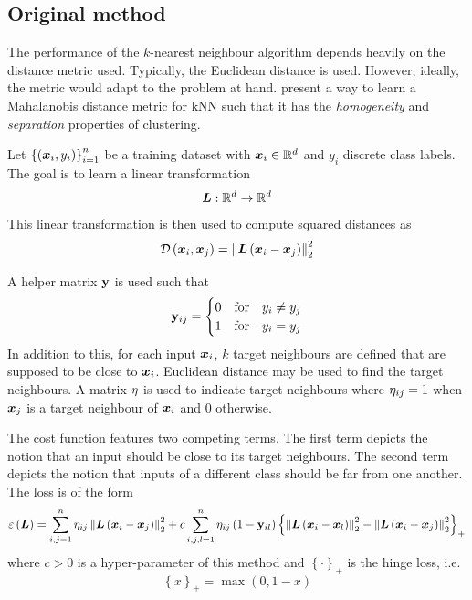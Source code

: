 \subsection{Original method}
The performance of the \( k \)-nearest neighbour algorithm depends heavily on the distance metric used. Typically, the Euclidean distance is used. However, ideally, the metric would adapt to the problem at hand. \cite{weinberger_distance_2006} present a way to learn a Mahalanobis distance metric for kNN such that it has the \textit{homogeneity} and \textit{separation} properties of clustering.

Let \( \left\{ \left( \bm{x}_i, y_i \right) \right\}_{i = 1}^n \) be a training dataset with \( \bm{x}_i \in \mathbb{R}^d \) and \( y_i \) discrete class labels. The goal is to learn a linear transformation
\[ \bm{L} : \mathbb{R}^d \to \mathbb{R}^d \]
This linear transformation is then used to compute squared distances as
\[ \mathcal{D} \left( \bm{x}_i, \bm{x}_j \right) = \left\lVert \bm{L} \left( \bm{x}_i - \bm{x}_j \right) \right\rVert_2^2 \]

A helper matrix \( \mathbf{y} \) is used such that
\[ \mathbf{y}_{ij} = \begin{cases}
    0 &\text{for} \quad y_i \neq y_j \\
    1 &\text{for} \quad y_i = y_j \\
  \end{cases} \]
In addition to this, for each input \( \bm{x}_i \), \( k \) target neighbours are defined that are supposed to be close to \( \bm{x}_i \). Euclidean distance may be used to find the target neighbours. A matrix \( \mathbf{\eta} \) is used to indicate target neighbours where \( \mathbf{\eta}_{ij} = 1 \) when \( \bm{x}_j \) is a target neighbour of \( \bm{x}_i \) and \( 0 \) otherwise.

The cost function features two competing terms. The first term depicts the notion that an input should be close to its target neighbours. The second term depicts the notion that inputs of a different class should be far from one another. The loss is of the form
\[ \varepsilon \left( \bm{L} \right) = \sum_{i, j = 1}^n \mathbf{\eta}_{ij} \left\lVert \bm{L} \left( \bm{x}_i - \bm{x}_j \right) \right\rVert_2^2 + c \sum_{i, j, l = 1}^n \mathbf{\eta}_{ij} \left( 1 - \mathbf{y}_{il} \right) \left\{ \left\lVert \bm{L} \left( \bm{x}_i - \bm{x}_l \right) \right\rVert_2^2 - \left\lVert \bm{L} \left( \bm{x}_i - \bm{x}_j \right) \right\rVert_2^2 \right\}_+ \]
where \( c > 0 \) is a hyper-parameter of this method and \( \left\{ \cdot \right\}_+ \) is the hinge loss, i.e.
\[ \left\{ x \right\}_+ = \max \left( 0, 1 - x \right) \]

